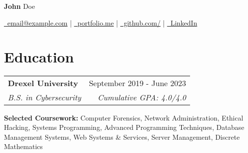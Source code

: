 \documentclass[letterpaper, 11pt]{article}
\makeatletter
\newcommand{\educationItem}[4]{
    \vspace{-1pt}
    \begin{tabular*}{1.0\textwidth}{l@{\extracolsep{\fill}}r}
        \textbf{#1} & #2 \\
        \textit{\small #3} & \textit{\small #4}
    \end{tabular*}\vspace{-5pt}
}
\newcommand{\resumeItem}[2]{
    \item\small{
        \textbf{#1}{ #2 \vspace{-5pt}}
    }
}
\makeatother
\begin{document}

\begin{center}
\\~\\
    \vspace{-10pt}
    {\huge \textbf{John} Doe}\vspace{5pt}
    
    \href{mailto:email@example.com}{\faEnvelope \, {email@example.com}} |
    \href{https://portfolio.me/}{\faLink \, portfolio.me} |
    \href{https://www.github.com/}{\faGithub \, github.com/} |
    \href{https://www.linkedin.com/}{\faLinkedin \, LinkedIn}
    
    
\end{center}

\vspace{-15pt}
\section{Education}

\educationItem
    {Drexel University}{September 2019 - June 2023}{B.S. in Cybersecurity}{Cumulative GPA: 4.0/4.0}
    
\resumeItem
    {Selected Coursework:}{Computer Forensics, Network Administration, Ethical Hacking, Systems Programming, Advanced Programming Techniques, Database Management Systems, Web Systems \& Services, Server Management, Discrete Mathematics}

\end{document}
